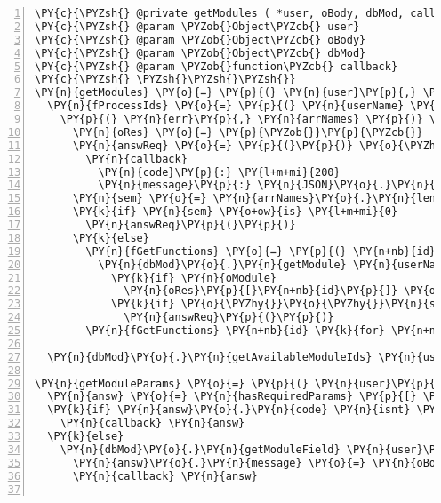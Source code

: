 \begin{Verbatim}[fontsize=\scriptsize,commandchars=\\\{\},numbers=left,firstnumber=1,stepnumber=1]
\PY{c}{\PYZsh{} @private getModules ( *user, oBody, dbMod, callback* )}
\PY{c}{\PYZsh{} @param \PYZob{}Object\PYZcb{} user}
\PY{c}{\PYZsh{} @param \PYZob{}Object\PYZcb{} oBody}
\PY{c}{\PYZsh{} @param \PYZob{}Object\PYZcb{} dbMod}
\PY{c}{\PYZsh{} @param \PYZob{}function\PYZcb{} callback}
\PY{c}{\PYZsh{} \PYZsh{}\PYZsh{}\PYZsh{}}
\PY{n}{getModules} \PY{o}{=} \PY{p}{(} \PY{n}{user}\PY{p}{,} \PY{n}{oBody}\PY{p}{,} \PY{n}{dbMod}\PY{p}{,} \PY{n}{callback} \PY{p}{)} \PY{o}{\PYZhy{}}\PY{o}{\PYZgt{}}
  \PY{n}{fProcessIds} \PY{o}{=} \PY{p}{(} \PY{n}{userName} \PY{p}{)} \PY{o}{\PYZhy{}}\PY{o}{\PYZgt{}}
    \PY{p}{(} \PY{n}{err}\PY{p}{,} \PY{n}{arrNames} \PY{p}{)} \PY{o}{\PYZhy{}}\PY{o}{\PYZgt{}}
      \PY{n}{oRes} \PY{o}{=} \PY{p}{\PYZob{}}\PY{p}{\PYZcb{}}
      \PY{n}{answReq} \PY{o}{=} \PY{p}{(}\PY{p}{)} \PY{o}{\PYZhy{}}\PY{o}{\PYZgt{}}
        \PY{n}{callback}
          \PY{n}{code}\PY{p}{:} \PY{l+m+mi}{200}
          \PY{n}{message}\PY{p}{:} \PY{n}{JSON}\PY{o}{.}\PY{n}{stringify} \PY{n}{oRes}
      \PY{n}{sem} \PY{o}{=} \PY{n}{arrNames}\PY{o}{.}\PY{n}{length}
      \PY{k}{if} \PY{n}{sem} \PY{o+ow}{is} \PY{l+m+mi}{0}
        \PY{n}{answReq}\PY{p}{(}\PY{p}{)}
      \PY{k}{else}
        \PY{n}{fGetFunctions} \PY{o}{=} \PY{p}{(} \PY{n+nb}{id} \PY{p}{)} \PY{o}{=}\PY{o}{\PYZgt{}}
          \PY{n}{dbMod}\PY{o}{.}\PY{n}{getModule} \PY{n}{userName}\PY{p}{,} \PY{n+nb}{id}\PY{p}{,} \PY{p}{(} \PY{n}{err}\PY{p}{,} \PY{n}{oModule} \PY{p}{)} \PY{o}{=}\PY{o}{\PYZgt{}}
            \PY{k}{if} \PY{n}{oModule}
              \PY{n}{oRes}\PY{p}{[}\PY{n+nb}{id}\PY{p}{]} \PY{o}{=} \PY{n}{JSON}\PY{o}{.}\PY{n}{parse} \PY{n}{oModule}\PY{o}{.}\PY{n}{functions}
            \PY{k}{if} \PY{o}{\PYZhy{}}\PY{o}{\PYZhy{}}\PY{n}{sem} \PY{o+ow}{is} \PY{l+m+mi}{0}
              \PY{n}{answReq}\PY{p}{(}\PY{p}{)}
        \PY{n}{fGetFunctions} \PY{n+nb}{id} \PY{k}{for} \PY{n+nb}{id} \PY{o+ow}{in} \PY{n}{arrNames}

  \PY{n}{dbMod}\PY{o}{.}\PY{n}{getAvailableModuleIds} \PY{n}{user}\PY{o}{.}\PY{n}{username}\PY{p}{,} \PY{n}{fProcessIds} \PY{n}{user}\PY{o}{.}\PY{n}{username}

\PY{n}{getModuleParams} \PY{o}{=} \PY{p}{(} \PY{n}{user}\PY{p}{,} \PY{n}{oBody}\PY{p}{,} \PY{n}{dbMod}\PY{p}{,} \PY{n}{callback} \PY{p}{)} \PY{o}{\PYZhy{}}\PY{o}{\PYZgt{}}
  \PY{n}{answ} \PY{o}{=} \PY{n}{hasRequiredParams} \PY{p}{[} \PY{l+s}{\PYZsq{}}\PY{l+s}{id}\PY{l+s}{\PYZsq{}} \PY{p}{]}\PY{p}{,} \PY{n}{oBody}
  \PY{k}{if} \PY{n}{answ}\PY{o}{.}\PY{n}{code} \PY{n}{isnt} \PY{l+m+mi}{200}
    \PY{n}{callback} \PY{n}{answ}
  \PY{k}{else}
    \PY{n}{dbMod}\PY{o}{.}\PY{n}{getModuleField} \PY{n}{user}\PY{o}{.}\PY{n}{username}\PY{p}{,} \PY{n}{oBody}\PY{o}{.}\PY{n}{id}\PY{p}{,} \PY{l+s}{\PYZdq{}}\PY{l+s}{params}\PY{l+s}{\PYZdq{}}\PY{p}{,} \PY{p}{(} \PY{n}{err}\PY{p}{,} \PY{n}{oBody} \PY{p}{)} \PY{o}{\PYZhy{}}\PY{o}{\PYZgt{}}
      \PY{n}{answ}\PY{o}{.}\PY{n}{message} \PY{o}{=} \PY{n}{oBody}
      \PY{n}{callback} \PY{n}{answ}


\end{Verbatim}
